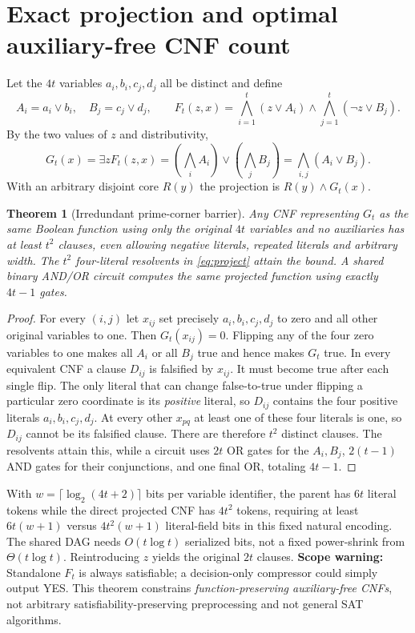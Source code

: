 \documentclass[11pt]{article}
\newtheorem{theorem}{Theorem}
\begin{document}
\section{Exact projection and optimal auxiliary-free CNF count}
Let the $4t$ variables $a_i,b_i,c_j,d_j$ all be distinct and define
\[
 A_i=a_i\vee b_i,\quad B_j=c_j\vee d_j,\qquad
 F_t(z,x)=\bigwedge_{i=1}^{t}(z\vee A_i)
             \land\bigwedge_{j=1}^{t}(\neg z\vee B_j).
\]
By the two values of $z$ and distributivity,
\begin{equation}\label{eq:project}
 G_t(x)=\exists z F_t(z,x)
 =\left(\bigwedge_i A_i\right)\vee\left(\bigwedge_j B_j\right)
 =\bigwedge_{i,j}(A_i\vee B_j).
\end{equation}
With an arbitrary disjoint core $R(y)$ the projection is $R(y)\land G_t(x)$.

\begin{theorem}[Irredundant prime-corner barrier]\label{th:clauses}
Any CNF representing $G_t$ as the same Boolean function \emph{using only the original $4t$ variables and no auxiliaries} has at least $t^2$ clauses, even allowing negative literals, repeated literals and arbitrary width. The $t^2$ four-literal resolvents in \eqref{eq:project} attain the bound. A shared binary AND/OR circuit computes the same projected function using exactly $4t-1$ gates.
\end{theorem}
\begin{proof}
For every $(i,j)$ let $x_{ij}$ set precisely $a_i,b_i,c_j,d_j$ to zero and all other original variables to one. Then $G_t(x_{ij})=0$. Flipping any of the four zero variables to one makes all $A_i$ or all $B_j$ true and hence makes $G_t$ true. In every equivalent CNF a clause $D_{ij}$ is falsified by $x_{ij}$. It must become true after each single flip. The only literal that can change false-to-true under flipping a particular zero coordinate is its \emph{positive} literal, so $D_{ij}$ contains the four positive literals $a_i,b_i,c_j,d_j$. At every other $x_{pq}$ at least one of these four literals is one, so $D_{ij}$ cannot be its falsified clause. There are therefore $t^2$ distinct clauses. The resolvents attain this, while a circuit uses $2t$ OR gates for the $A_i,B_j$, $2(t-1)$ AND gates for their conjunctions, and one final OR, totaling $4t-1$.
\end{proof}
\noindent With $w=\lceil\log_2(4t+2)\rceil$ bits per variable identifier, the parent has $6t$ literal tokens while the direct projected CNF has $4t^2$ tokens, requiring at least $6t(w+1)$ versus $4t^2(w+1)$ literal-field bits in this fixed natural encoding. The shared DAG needs $O(t\log t)$ serialized bits, not a fixed power-shrink from $\Theta(t\log t)$. Reintroducing $z$ yields the original $2t$ clauses. \textbf{Scope warning:} Standalone $F_t$ is always satisfiable; a decision-only compressor could simply output YES. This theorem constrains \emph{function-preserving auxiliary-free CNFs}, not arbitrary satisfiability-preserving preprocessing and not general SAT algorithms.
\end{document}
